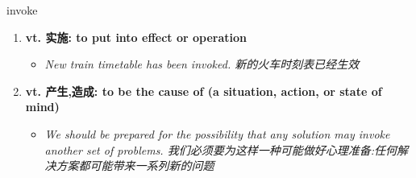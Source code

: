 
\begin{frame}
{\huge invoke}
\begin{center}
\begin{enumerate}\Large
  \item \textbf{vt. 实施: to put into effect or operation}
  \begin{itemize}
    \item \em{\Large{New train timetable has been invoked. 新的火车时刻表已经生效}}
  \end{itemize}
  \item \textbf{vt. 产生,造成: to be the cause of (a situation, action, or state of mind)}
  \begin{itemize}
    \item \em{\Large{We should be prepared for the possibility that any solution may invoke another set of problems. 我们必须要为这样一种可能做好心理准备:任何解决方案都可能带来一系列新的问题}}
  \end{itemize}
\end{enumerate}
\end{center}
\end{frame}
